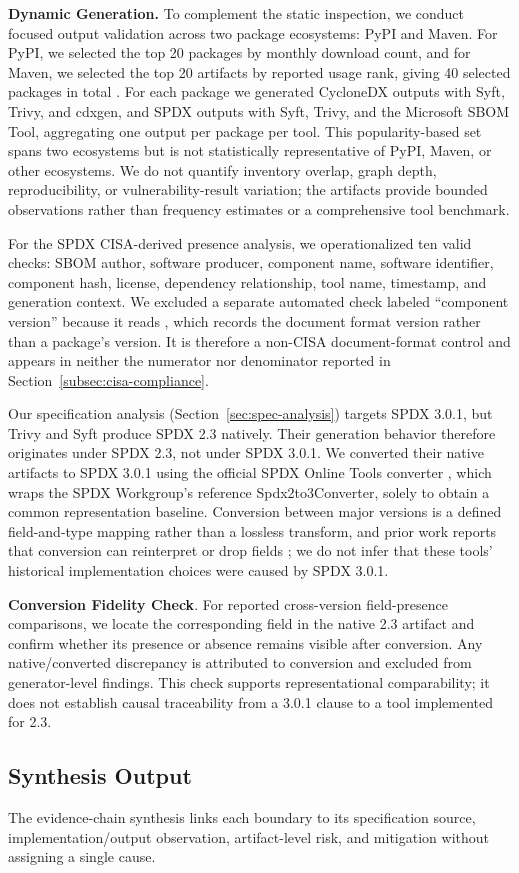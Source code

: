 \textbf{Dynamic Generation.} To complement the static inspection, we conduct focused output validation across two package ecosystems: PyPI and Maven. For PyPI, we selected the top 20 packages by monthly download count, and for Maven, we selected the top 20 artifacts by reported usage rank, giving 40 selected packages in total \cite{pypistats, mvnrepository}. For each package we generated CycloneDX outputs with Syft, Trivy, and cdxgen, and SPDX outputs with Syft, Trivy, and the Microsoft SBOM Tool, aggregating one output per package per tool. This popularity-based set spans two ecosystems but is not statistically representative of
PyPI, Maven, or other ecosystems. We do not quantify inventory overlap, graph depth, reproducibility, or vulnerability-result variation; the artifacts provide bounded observations rather than frequency estimates or a comprehensive tool benchmark.

For the SPDX CISA-derived presence analysis, we operationalized ten valid checks: SBOM author, software producer, component name, software identifier, component hash, license, dependency relationship, tool name, timestamp, and generation context. We excluded a separate automated check labeled ``component version'' because it reads , which records the document format version rather than a package's version. It is therefore a non-CISA document-format control and appears in neither the numerator nor denominator reported in Section~\ref{subsec:cisa-compliance}.

Our specification analysis (Section~\ref{sec:spec-analysis}) targets SPDX 3.0.1, but Trivy and Syft produce SPDX 2.3 natively. Their generation behavior therefore originates under SPDX 2.3, not under SPDX 3.0.1. We converted their native artifacts to SPDX 3.0.1 using the official SPDX Online Tools converter \cite{spdxonlinetools}, which wraps the SPDX Workgroup's reference Spdx2to3Converter, solely to obtain a common representation baseline. Conversion between major versions is a defined field-and-type mapping rather than a lossless transform, and prior work reports that conversion can reinterpret or drop fields \cite{sbomlandscape}; we do not infer that these tools' historical implementation choices were caused by SPDX 3.0.1.

\textbf{Conversion Fidelity Check}. For reported cross-version field-presence comparisons, we locate the corresponding field in the native 2.3 artifact and confirm whether its presence or absence remains visible after conversion. Any native/converted discrepancy is attributed to conversion and excluded from generator-level findings. This check supports representational comparability; it does not establish causal traceability from a 3.0.1 clause to a tool implemented for 2.3.

\subsection{Synthesis Output}
The evidence-chain synthesis links each boundary to its specification source, implementation/output observation, artifact-level risk, and mitigation without assigning a single cause.
